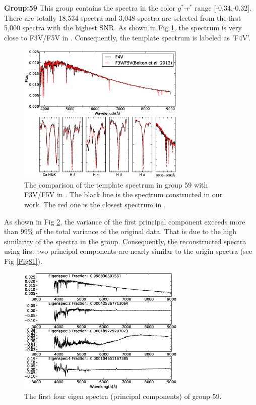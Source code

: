 \documentclass[referee]{raa}            %
\begin{document}
\textbf{Group:59}
This group contains the spectra in the color $g^*$-$r^*$ range [-0.34,-0.32].
There are totally 18,534 spectra and 3,048 spectra are selected from the first 5,000 spectra with the highest SNR.
As shown in Fig \ref{Fig91}, the spectrum is very close to F3V/F5V in \citet{bolton2012spectral}.
Consequently, the template spectrum is labeled as 'F4V'.
\begin{figure}
   \centering
   \includegraphics[width=8cm, angle=0,clip]{f91.eps}
   \caption{The comparison of the template spectrum in group 59 with  F3V/F5V in \citet{bolton2012spectral}.
The black line is the spectrum constructed in our work.
The red one is the closest spectrum in \citet{bolton2012spectral}.
   }
   \label{Fig91}
\end{figure}

As shown in Fig \ref{Fig71},  the variance of the first  principal component  exceeds more than 99\% of the total variance of the original data.
That is due to the high similarity of the spectra in the group.
Consequently, the reconstructed spectra using first two  principal components are nearly similar to the origin spectra (see Fig \ref{Fig81}).

 \begin{figure}
   \centering
   \includegraphics[width=8cm, angle=0,clip]{f71.eps}
   \caption{The first four eigen spectra (principal components) of group 59.
   }
   \label{Fig71}
\end{figure}
\end{document}
